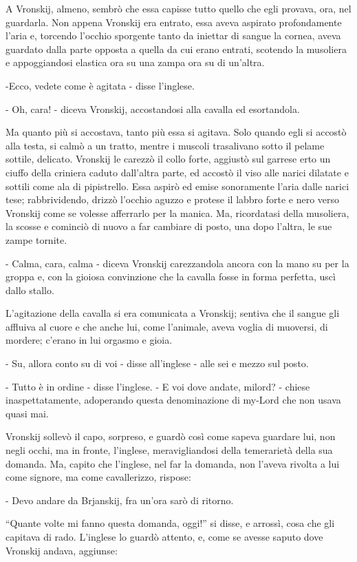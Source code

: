 A Vronskij, almeno, sembrò che essa capisse tutto quello che egli provava, ora, nel guardarla. Non appena Vronskij era entrato, essa aveva aspirato profondamente l'aria e, torcendo l'occhio sporgente tanto da iniettar di sangue la cornea, aveva guardato dalla parte opposta a quella da cui erano entrati, scotendo la musoliera e appoggiandosi elastica ora su una zampa ora su di un'altra. 

-Ecco, vedete come è agitata - disse l'inglese. 

- Oh, cara! - diceva Vronskij, accostandosi alla cavalla ed esortandola. 

Ma quanto più si accostava, tanto più essa si agitava. Solo quando egli si accostò alla testa, si calmò a un tratto, mentre i muscoli trasalivano sotto il pelame sottile, delicato. Vronskij le carezzò il collo forte, aggiustò sul garrese erto un ciuffo della criniera caduto dall'altra parte, ed accostò il viso alle narici dilatate e sottili come ala di pipistrello. Essa aspirò ed emise sonoramente l'aria dalle narici tese; rabbrividendo, drizzò l'occhio aguzzo e protese il labbro forte e nero verso Vronskij come se volesse afferrarlo per la manica. Ma, ricordatasi della musoliera, la scosse e cominciò di nuovo a far cambiare di posto, una dopo l'altra, le sue zampe tornite. 

- Calma, cara, calma - diceva Vronskij carezzandola ancora con la mano su per la groppa e, con la gioiosa convinzione che la cavalla fosse in forma perfetta, uscì dallo stallo. 

L'agitazione della cavalla si era comunicata a Vronskij; sentiva che il sangue gli affluiva al cuore e che anche lui, come l'animale, aveva voglia di muoversi, di mordere; c'erano in lui orgasmo e gioia. 

- Su, allora conto su di voi - disse all'inglese - alle sei e mezzo sul posto. 

- Tutto è in ordine - disse l'inglese. - E voi dove andate, milord? - chiese inaspettatamente, adoperando questa denominazione di my-Lord che non usava quasi mai. 

Vronskij sollevò il capo, sorpreso, e guardò così come sapeva guardare lui, non negli occhi, ma in fronte, l'inglese, meravigliandosi della temerarietà della sua domanda. Ma, capito che l'inglese, nel far la domanda, non l'aveva rivolta a lui come signore, ma come cavallerizzo, rispose: 

- Devo andare da Brjanskij, fra un'ora sarò di ritorno. 

``Quante volte mi fanno questa domanda, oggi!'' si disse, e arrossì, cosa che gli capitava di rado. L'inglese lo guardò attento, e, come se avesse saputo dove Vronskij andava, aggiunse: 

